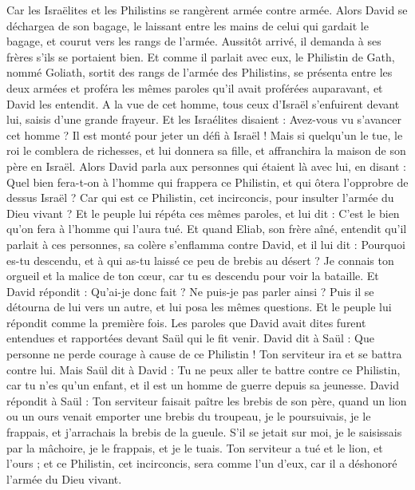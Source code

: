 \begin{multicols}{2}
Car les Israëlites et les Philistins se rangèrent armée contre armée.
Alors David se déchargea de son bagage, le laissant entre les mains de celui qui gardait le bagage, et courut vers les rangs de l'armée. Aussitôt arrivé, il demanda à ses frères s'ils se portaient bien.
Et comme il parlait avec eux, le Philistin de Gath, nommé Goliath, sortit des rangs de l'armée des Philistins, se présenta entre les deux armées et proféra les mêmes paroles qu'il avait proférées auparavant, et David les entendit.
A la vue de cet homme, tous ceux d'Israël s'enfuirent devant lui, saisis d'une grande frayeur.
Et les Israélites disaient : Avez-vous vu s'avancer cet homme ? Il est monté pour jeter un défi à Israël ! Mais si quelqu'un le tue, le roi le comblera de richesses, et lui donnera sa fille, et affranchira la maison de son père en Israël.
Alors David parla aux personnes qui étaient là avec lui, en disant : Quel bien fera-t-on à l'homme qui frappera ce Philistin, et qui ôtera l'opprobre de dessus Israël ? Car qui est ce Philistin, cet incirconcis, pour insulter l'armée du Dieu vivant ?
Et le peuple lui répéta ces mêmes paroles, et lui dit : C'est le bien qu'on fera à l'homme qui l'aura tué.
Et quand Eliab, son frère aîné, entendit qu'il parlait à ces personnes, sa colère s'enflamma contre David, et il lui dit : Pourquoi es-tu descendu, et à qui as-tu laissé ce peu de brebis au désert ? Je connais ton orgueil et la malice de ton cœur, car tu es descendu pour voir la bataille.
Et David répondit : Qu'ai-je donc fait ? Ne puis-je pas parler ainsi ?
Puis il se détourna de lui vers un autre, et lui posa les mêmes questions. Et le peuple lui répondit comme la première fois.
Les paroles que David avait dites furent entendues et rapportées devant Saül qui le fit venir.
David dit à Saül : Que personne ne perde courage à cause de ce Philistin ! Ton serviteur ira et se battra contre lui.
Mais Saül dit à David : Tu ne peux aller te battre contre ce Philistin, car tu n'es qu'un enfant, et il est un homme de guerre depuis sa jeunesse.
David répondit à Saül : Ton serviteur faisait paître les brebis de son père, quand un lion ou un ours venait emporter une brebis du troupeau,
je le poursuivais, je le frappais, et j'arrachais la brebis de la gueule. S'il se jetait sur moi, je le saisissais par la mâchoire, je le frappais, et je le tuais.
Ton serviteur a tué et le lion, et l'ours ; et ce Philistin, cet incirconcis, sera comme l'un d'eux, car il a déshonoré l'armée du Dieu vivant.

\end{multicols}
